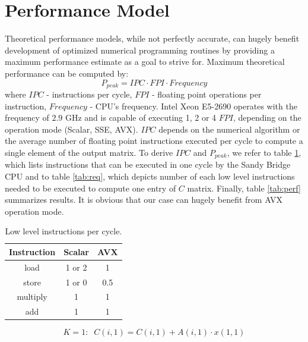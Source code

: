 \documentclass[journal, a4paper]{IEEEtran}
\begin{document}
\section{Performance Model}
    Theoretical performance models, while not perfectly accurate, can hugely benefit development of optimized numerical programming routines by providing a maximum performance estimate as a goal to strive for. Maximum theoretical performance can be computed by: 
    \begin{equation}
     P_{peak} = IPC \cdot FPI \cdot Frequency
    \end{equation}
    where $IPC$ - instructions per cycle, $FPI$ - floating point operations per instruction, $Frequency$ - CPU's frequency. Intel Xeon E5-2690 operates with the frequency of $2.9$ GHz and is capable of executing 1, 2 or 4 $FPI$, depending on the operation mode (Scalar, SSE, AVX). $IPC$ depends on the numerical algorithm or the average number of floating point instructions executed per cycle to compute a single element of the output matrix. To derive $IPC$ and $P_{peak}$, we refer to table \ref{tab:low_level}, which lists instructions that can be executed in one cycle by the Sandy Bridge CPU and to table \ref{tab:req}, which depicts number of each low level instructions needed to be executed to compute one entry of $C$ matrix. Finally, table \ref{tab:perf} summarizes results. It is obvious that our case can hugely benefit from AVX operation mode.
    
      \begin{table}[!hbt]
	\begin{center}
	  \caption{Low level instructions per cycle.}
	  \label{tab:low_level}
	  \begin{tabular}{c|c|c}
		  Instruction	& Scalar & AVX \\
		  \hline
		  load		& 1 or 2 & 1 \\
		  \hline
		  store		& 1 or 0 & 0.5 \\
		  \hline
		  multiply	& 1 & 1 \\
		  \hline
		  add 		& 1 & 1 \\
	  \end{tabular}
	\end{center}
      \end{table}
      
      \begin{equation}      
	  K=1:\;\;C(i, 1) = C(i, 1) + A(i, 1) \cdot x(1, 1) 
      \end{equation} 
      
\end{document}
